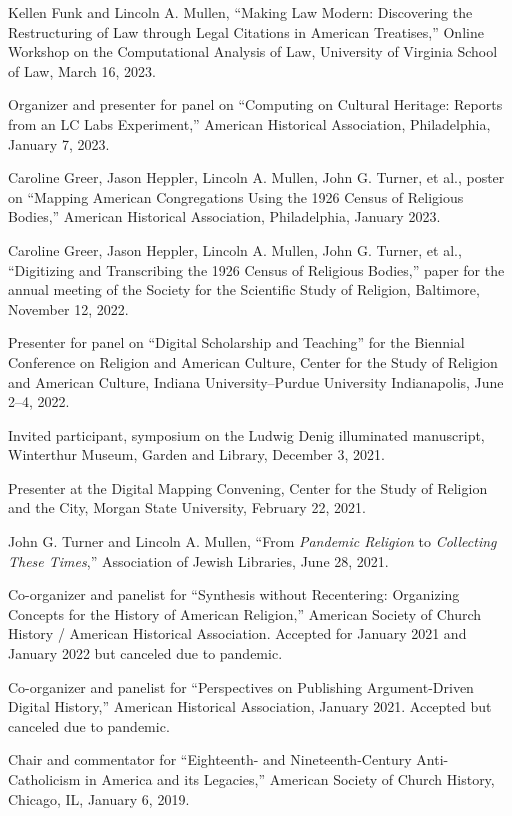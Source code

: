 \documentclass[11pt]{article}
\begin{document}
Kellen Funk and Lincoln A. Mullen, ``Making Law Modern: Discovering the Restructuring of Law through Legal Citations in American Treatises,'' Online Workshop on the Computational Analysis of Law, University of Virginia School of Law, March 16, 2023.  

Organizer and presenter for panel on ``Computing on Cultural Heritage: Reports from an LC Labs Experiment,'' American Historical Association, Philadelphia, January 7, 2023.

Caroline Greer, Jason Heppler, Lincoln A. Mullen, John G. Turner, et al., poster on ``Mapping American Congregations Using the 1926 Census of Religious Bodies,'' American Historical Association, Philadelphia, January 2023.

Caroline Greer, Jason Heppler, Lincoln A. Mullen, John G. Turner, et al., ``Digitizing and Transcribing the 1926 Census of Religious Bodies,'' paper for the annual meeting of the Society for the Scientific Study of Religion, Baltimore, November 12, 2022.

Presenter for panel on ``Digital Scholarship and Teaching'' for the Biennial Conference on Religion and American Culture, Center for the Study of Religion and American Culture, Indiana University–Purdue University Indianapolis, June 2--4, 2022.

Invited participant, symposium on the Ludwig Denig illuminated manuscript, Winterthur Museum, Garden and Library, December 3, 2021.

Presenter at the Digital Mapping Convening, Center for the Study of Religion and the City, Morgan State University, February 22, 2021.

John G. Turner and Lincoln A. Mullen, ``From \emph{Pandemic Religion} to \emph{Collecting These Times},'' Association of Jewish Libraries, June 28, 2021.

Co-organizer and panelist for ``Synthesis without Recentering: Organizing Concepts for the History of American Religion,'' American Society of Church History / American Historical Association. Accepted for January 2021 and January 2022 but canceled due to pandemic.

Co-organizer and panelist for ``Perspectives on Publishing Argument-Driven Digital History,'' American Historical Association, January 2021. Accepted but canceled due to pandemic.

Chair and commentator for ``Eighteenth- and Nineteenth-Century Anti-Catholicism in America and its Legacies,'' American Society of Church History, Chicago, IL, January 6, 2019.
\end{document}

